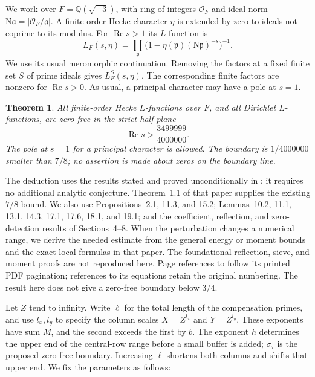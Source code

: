 \documentclass[10pt,reqno,a4paper]{amsart}
\newtheorem{theorem}{Theorem}[section]
\theoremstyle{remark}
\newcommand{\N}{\mathrm N}
\newcommand{\Rea}{\operatorname{Re}}
\newcommand{\pp}{\mathfrak p}
\newcommand{\OO}{\mathcal O_F}
\newcommand{\st}{\sigma_\tau}
\begin{document}
We work over $F=\mathbb Q(\sqrt{-3})$, with ring of integers $\OO$ and ideal
norm $\N\mathfrak a=|\OO/\mathfrak a|$. A finite-order Hecke character
$\eta$ is extended by zero to ideals not coprime to its modulus. For
$\Rea s>1$ its $L$-function is
\[
 L_F(s,\eta)=\prod_{\pp}
       \bigl(1-\eta(\pp)(\N\pp)^{-s}\bigr)^{-1}.
\]
We use its usual meromorphic continuation. Removing the factors at a fixed
finite set $S$ of prime ideals gives $L_F^S(s,\eta)$. The corresponding
finite factors are nonzero for $\Rea s>0$. As usual, a principal character
may have a pole at $s=1$.

\begin{theorem}\label{main}
All finite-order Hecke $L$-functions over $F$, and all
Dirichlet $L$-functions, are zero-free in the strict half-plane
\[
             \Rea s>\frac{3499999}{4000000}.
\]
The pole at $s=1$ for a principal character is allowed. The boundary is
$1/4000000$ smaller than $7/8$; no assertion is made about zeros on the
boundary line.
\end{theorem}

The deduction uses the results stated and proved unconditionally in
\cite{q30}; it requires no additional analytic conjecture.
Theorem~1.1 of that paper supplies the existing
$7/8$ bound. We also use Propositions~2.1, 11.3, and 15.2;
Lemmas~10.2, 11.1, 13.1, 14.3, 17.1, 17.6, 18.1, and 19.1; and the
coefficient, reflection, and zero-detection results of Sections~4--8.
When the perturbation changes a numerical range, we derive the needed
estimate from the general energy or moment bounds and the exact local
formulas in that paper. The foundational reflection, sieve, and moment
proofs are not reproduced here. Page references to \cite{q30} follow
its printed PDF pagination; references to its equations retain the
original numbering. The result here does not give a zero-free boundary
below $3/4$.

Let $Z$ tend to infinity. Write $\ell$ for the total length of the
compensation primes, and use $l_x,l_y$ to specify the column scales
$X=Z^{l_x}$ and $Y=Z^{l_y}$. These exponents have sum $M$, and the second exceeds the first
by $b$. The exponent $h$ determines the upper end of the central-row
range before a small buffer is added; $\st$ is the proposed zero-free
boundary. Increasing $\ell$ shortens both columns and shifts that upper
end. We fix the parameters as follows:
\end{document}

